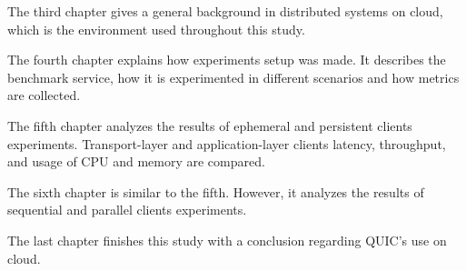 The third chapter gives a general background in distributed systems on cloud, which is the environment used throughout this study.

The fourth chapter explains how experiments setup was made. It describes the benchmark service, how it is experimented in different scenarios and how metrics are collected.

The fifth chapter analyzes the results of ephemeral and persistent clients experiments. Transport-layer and application-layer clients latency, throughput, and usage of CPU and memory are compared.

The sixth chapter is similar to the fifth. However, it analyzes the results of sequential and parallel clients experiments.

The last chapter finishes this study with a conclusion regarding QUIC's use on cloud.
